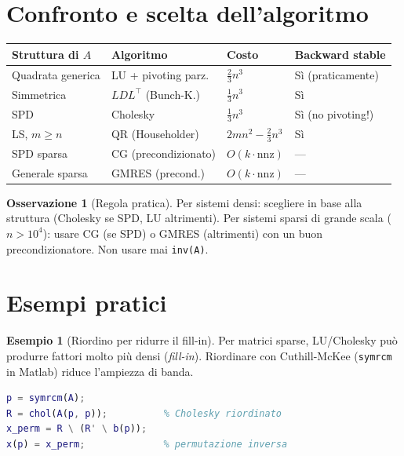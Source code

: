 \documentclass[11pt, a4paper, twoside]{book}
\theoremstyle{definition}
\newtheorem{example}{Esempio}[chapter]
\newtheorem{remark}{Osservazione}[chapter]
\theoremstyle{plain}
\theoremstyle{remark}
\begin{document}
\section{Confronto e scelta dell'algoritmo}

\begin{center}
\renewcommand{\arraystretch}{1.4}
\begin{tabular}{llll}
\hline
\textbf{Struttura di $A$} & \textbf{Algoritmo} & \textbf{Costo} & \textbf{Backward stable} \\
\hline
Quadrata generica & LU + pivoting parz. & $\frac{2}{3}n^3$ & Sì (praticamente) \\
Simmetrica & $LDL^\top$ (Bunch-K.) & $\frac{1}{3}n^3$ & Sì \\
SPD & Cholesky & $\frac{1}{3}n^3$ & Sì (no pivoting!) \\
LS, $m \geq n$ & QR (Householder) & $2mn^2 - \frac{2}{3}n^3$ & Sì \\
SPD sparsa & CG (precondizionato) & $O(k \cdot \mathrm{nnz})$ & — \\
Generale sparsa & GMRES (precond.) & $O(k \cdot \mathrm{nnz})$ & — \\
\hline
\end{tabular}
\end{center}

\begin{remark}[Regola pratica]
Per sistemi densi: scegliere in base alla struttura (Cholesky se SPD, LU altrimenti). Per sistemi sparsi di grande scala ($n > 10^4$): usare CG (se SPD) o GMRES (altrimenti) con un buon precondizionatore. Non usare mai \texttt{inv(A)}.
\end{remark}

\section{Esempi pratici}

\begin{example}[Riordino per ridurre il fill-in]
Per matrici sparse, LU/Cholesky può produrre fattori molto più densi (\emph{fill-in}). Riordinare con Cuthill-McKee (\texttt{symrcm} in Matlab) riduce l'ampiezza di banda.
\begin{lstlisting}[language=Matlab]
p = symrcm(A);
R = chol(A(p, p));          % Cholesky riordinato
x_perm = R \ (R' \ b(p));
x(p) = x_perm;              % permutazione inversa
\end{lstlisting}
\end{example}
\end{document}

